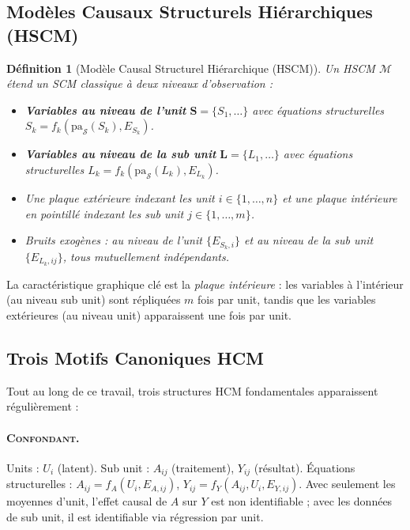 \documentclass[11pt,a4paper]{article}
\newcommand{\Sc}{\mathcal{S}}
\newcommand{\pa}{\mathrm{pa}}
\newcommand{\Mc}{\mathcal{M}}
\newtheorem{definition}{Définition}
\begin{document}
\subsection{Modèles Causaux Structurels Hiérarchiques (HSCM)}

\begin{definition}[Modèle Causal Structurel Hiérarchique (HSCM)]
Un HSCM $\Mc$ étend un SCM classique à deux niveaux d'observation :
\begin{itemize}
  \item \textbf{Variables au niveau de l'unit} $\mathbf{S} = \{S_1, \ldots\}$ avec équations structurelles $S_k = f_k(\pa_\Sc(S_k), E_{S_k})$.
  \item \textbf{Variables au niveau de la sub unit} $\mathbf{L} = \{L_1, \ldots\}$ avec équations structurelles $L_k = f_k(\pa_\Sc(L_k), E_{L_k})$.
  \item Une plaque extérieure indexant les unit $i \in \{1,\ldots,n\}$ et une plaque intérieure en pointillé indexant les sub unit $j \in \{1,\ldots,m\}$.
  \item Bruits exogènes : au niveau de l'unit $\{E_{S_k,i}\}$ et au niveau de la sub unit $\{E_{L_k,ij}\}$, tous mutuellement indépendants.
\end{itemize}
\end{definition}

La caractéristique graphique clé est la \emph{plaque intérieure} : les variables à l'intérieur (au niveau sub unit) sont répliquées $m$ fois par unit, tandis que les variables extérieures (au niveau unit) apparaissent une fois par unit.

\subsection{Trois Motifs Canoniques HCM}

Tout au long de ce travail, trois structures HCM fondamentales apparaissent régulièrement :

\paragraph{\textsc{Confondant}.}
Units : $U_i$ (latent). Sub unit : $A_{ij}$ (traitement), $Y_{ij}$ (résultat).
Équations structurelles : $A_{ij} = f_A(U_i, E_{A,ij})$, $Y_{ij} = f_Y(A_{ij}, U_i, E_{Y,ij})$.
Avec seulement les moyennes d'unit, l'effet causal de $A$ sur $Y$ est non identifiable ; avec les données de sub unit, il est identifiable via régression par unit.
\end{document}
